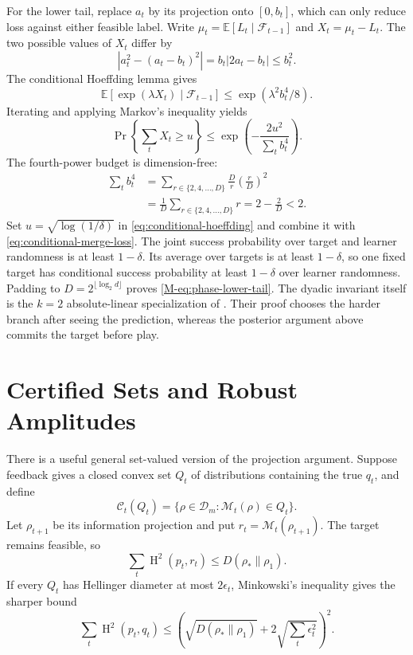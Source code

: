 \documentclass[twoside]{article}
\newcommand{\Dens}{\mathcal D}
\newcommand{\M}{\mathcal M}
\newcommand{\C}{\mathcal C}
\newcommand{\Hsq}{\operatorname{H}^2}
\begin{document}
For the lower tail, replace $a_t$ by its projection onto $[0,b_t]$, which can only reduce loss against either feasible label. Write $\mu_t=\mathbb E[L_t\mid\mathcal F_{t-1}]$ and $X_t=\mu_t-L_t$. The two possible values of $X_t$ differ by
\begin{equation}
|a_t^2-(a_t-b_t)^2|=b_t|2a_t-b_t|\leq b_t^2.
\end{equation}
The conditional Hoeffding lemma gives
\begin{equation}
\mathbb E[\exp(\lambda X_t)\mid\mathcal F_{t-1}]\leq\exp(\lambda^2b_t^4/8).
\end{equation}
Iterating and applying Markov's inequality yields
\begin{equation}
\Pr\left\{\sum_tX_t\geq u\right\}\leq\exp\left(-\frac{2u^2}{\sum_tb_t^4}\right).
\label{eq:conditional-hoeffding}
\end{equation}
The fourth-power budget is dimension-free:
\begin{align}
\sum_tb_t^4
&=\sum_{r\in\{2,4,\ldots,D\}}\frac Dr\left(\frac rD\right)^2\nonumber\\
&=\frac1D\sum_{r\in\{2,4,\ldots,D\}}r=2-\frac2D<2.
\end{align}
Set $u=\sqrt{\log(1/\delta)}$ in \eqref{eq:conditional-hoeffding} and combine it with \eqref{eq:conditional-merge-loss}. The joint success probability over target and learner randomness is at least $1-\delta$. Its average over targets is at least $1-\delta$, so one fixed target has conditional success probability at least $1-\delta$ over learner randomness. Padding to $D=2^{\lfloor\log_2d\rfloor}$ proves \eqref{M-eq:phase-lower-tail}. The dyadic invariant itself is the $k=2$ absolute-linear specialization of \citet{doronarad2026online}. Their proof chooses the harder branch after seeing the prediction, whereas the posterior argument above commits the target before play.

\section{Certified Sets and Robust Amplitudes}
\label{app:robust}

There is a useful general set-valued version of the projection argument. Suppose feedback gives a closed convex set $Q_t$ of distributions containing the true $q_t$, and define
\begin{equation}
\C_t(Q_t)=\{\rho\in\Dens_m:\M_t(\rho)\in Q_t\}.
\end{equation}
Let $\rho_{t+1}$ be its information projection and put $r_t=\M_t(\rho_{t+1})$. The target remains feasible, so
\begin{equation}
\sum_t\Hsq(p_t,r_t)\leq D(\rho_*\|\rho_1).
\label{eq:set-telescope}
\end{equation}
If every $Q_t$ has Hellinger diameter at most $2\epsilon_t$, Minkowski's inequality gives the sharper bound
\begin{equation}
\sum_t\Hsq(p_t,q_t)\leq\left(\sqrt{D(\rho_*\|\rho_1)}+2\sqrt{\sum_t\epsilon_t^2}\right)^2.
\end{equation}
\end{document}
